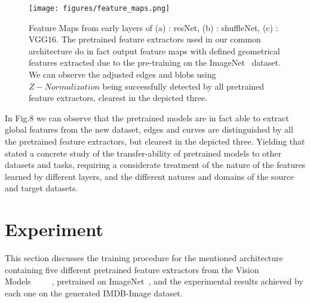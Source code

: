 \documentclass[conference]{IEEEtran}
\begin{document}
			    \begin{figure}[hbt!]
                \centerline{\texttt{[image: figures/feature\_maps.png]}}
                \caption{Feature Maps from early layers of (a) : resNet, (b) : shuffleNet, (c) : VGG16. The pretrained feature extractors used in our common architecture do in fact output feature maps with defined geometrical features extracted due to the pre-training on the ImageNet~\cite{imagenet} dataset. We can observe the adjusted edges and blobs using $Z-Normalization$ being successfully detected by all pretrained feature extractors, clearest in the depicted three.}
                \label{figure-6}
                \end{figure}

In Fig.8 we can observe that the pretrained models are in fact able to extract global features from the new dataset, edges and curves are distinguished by all the pretrained feature extractors, but clearest in the depicted three. Yielding that \cite{howtransferable} stated a concrete study of the transfer-ability of 
pretrained models to other datasets and tasks, requiring a considerate treatment of the nature of the features learned by different layers, and the different natures and domains of the source and target datasets.

\section{Experiment}
This section discusses the training procedure for the mentioned architecture containing five different pretrained feature extractors from the Vision Models~\cite{alexnet}~\cite{shufflenetv2}~\cite{vgg16}~\cite{resnet}~\cite{resnext}, pretrained on ImageNet~\cite{imagenet}, and the experimental results achieved by each one on the generated IMDB-Image dataset.
\end{document}
